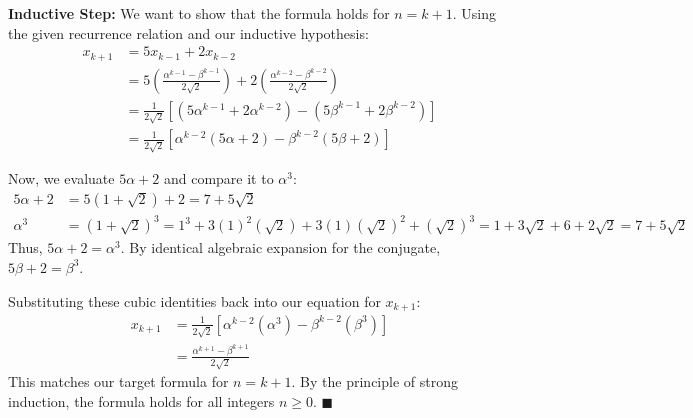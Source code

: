 \documentclass[11pt]{article}
\begin{document}
\begin{enumerate}[label=\textbf{(\alph*)}]
\textbf{Inductive Step:} We want to show that the formula holds for $n = k+1$.
Using the given recurrence relation and our inductive hypothesis:
\begin{align*}
  x_{k+1} &= 5x_{k-1} + 2x_{k-2} \\
          &= 5 \left( \frac{\alpha^{k-1} - \beta^{k-1}}{2\sqrt{2}} \right) + 2 \left( \frac{\alpha^{k-2} - \beta^{k-2}}{2\sqrt{2}} \right) \\
          &= \frac{1}{2\sqrt{2}} \left[ \left( 5\alpha^{k-1} + 2\alpha^{k-2} \right) - \left( 5\beta^{k-1} + 2\beta^{k-2} \right) \right] \\
          &= \frac{1}{2\sqrt{2}} \left[ \alpha^{k-2}(5\alpha + 2) - \beta^{k-2}(5\beta + 2) \right]
\end{align*}

Now, we evaluate $5\alpha + 2$ and compare it to $\alpha^3$:
\begin{align*}
  5\alpha + 2 &= 5(1+\sqrt{2}) + 2 = 7 + 5\sqrt{2} \\
  \alpha^3 &= (1+\sqrt{2})^3 = 1^3 + 3(1)^2(\sqrt{2}) + 3(1)(\sqrt{2})^2 + (\sqrt{2})^3 = 1 + 3\sqrt{2} + 6 + 2\sqrt{2} = 7 + 5\sqrt{2}
\end{align*}
Thus, $5\alpha + 2 = \alpha^3$. By identical algebraic expansion for the conjugate, $5\beta + 2 = \beta^3$.

Substituting these cubic identities back into our equation for $x_{k+1}$:
\begin{align*}
  x_{k+1} &= \frac{1}{2\sqrt{2}} \left[ \alpha^{k-2}(\alpha^3) - \beta^{k-2}(\beta^3) \right] \\
          &= \frac{\alpha^{k+1} - \beta^{k+1}}{2\sqrt{2}}
\end{align*}
This matches our target formula for $n = k+1$. By the principle of strong induction, the formula holds for all integers $n \ge 0$. \hfill $\blacksquare$

\end{enumerate}

\end{document}

